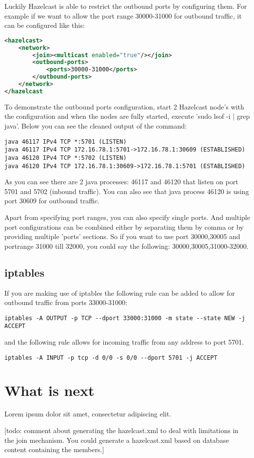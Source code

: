 Luckily Hazelcast is able to restrict the outbound ports by configuring them. For example if we want to allow the port range 30000-31000 for outbound traffic, it can be configured like this:
\begin{lstlisting}[language=xml]
<hazelcast>
    <network>
        <join><multicast enabled="true"/></join>
        <outbound-ports>
            <ports>30000-31000</ports>
        </outbound-ports>
    </network>
</hazelcast
\end{lstlisting}
To demonstrate the outbound ports configuration, start 2 Hazelcast node's with the configuration and when the nodes are fully started, execute 'sudo lsof -i | grep java'. Below you can see the cleaned output of the command:
\begin{lstlisting}
java 46117 IPv4 TCP *:5701 (LISTEN)
java 46117 IPv4 TCP 172.16.78.1:5701->172.16.78.1:30609 (ESTABLISHED)
java 46120 IPv4 TCP *:5702 (LISTEN)
java 46120 IPv4 TCP 172.16.78.1:30609->172.16.78.1:5701 (ESTABLISHED)
\end{lstlisting}
As you can see there are 2 java processes: 46117 and 46120 that listen on port 5701 and 5702 (inbound traffic). You can also see that java process 46120 is using port 30609 for outbound traffic.

Apart from specifying port ranges, you can also specify single ports. And multiple port configurations can be combined either by separating them by comma or by providing multiple 'ports' sections. So if you want to use port 30000,30005 and portrange 31000 till 32000, you could say the following: 30000,30005,31000-32000. 

\subsection{iptables}
If you are making use of iptables the following rule can be added to allow for outbound traffic from ports 33000-31000:
\begin{lstlisting}
iptables -A OUTPUT -p TCP --dport 33000:31000 -m state --state NEW -j ACCEPT
\end{lstlisting}
and the following rule allows for incoming traffic from any address to port 5701.
\begin{lstlisting}
iptables -A INPUT -p tcp -d 0/0 -s 0/0 --dport 5701 -j ACCEPT
\end{lstlisting}

\section{What is next}
Lorem ipsum dolor sit amet, consectetur adipiscing elit. 

[todo: comment about generating the hazelcast.xml to deal with limitations in the join mechanism. You could generate
a hazelcast.xml based on database content containing the members.]
